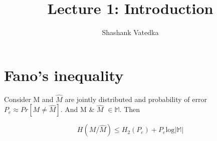 \documentclass{article}
\title{Lecture 1: Introduction}
\author{Shashank Vatedka}
\begin{document}
	
	
	

\section{Fano's inequality}
Consider M and $\hat{M}$ are jointly distributed and probability of error $P_e \approx Pr[M \neq \hat{M}]$. And M \& $\hat{M}$
 $\in \mathbb{M}$. Then 
 
\begin{equation}
	H(M/\hat{M}) \leq H_2 (P_e ) + P_e \text{log}|\mathbb{M}|
	\end{equation}
 
\end{document}
